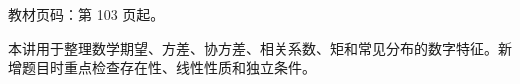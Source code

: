 
\begin{knowledgeBox}
教材页码：第 103 页起。

本讲用于整理数学期望、方差、协方差、相关系数、矩和常见分布的数字特征。新增题目时重点检查存在性、线性性质和独立条件。
\end{knowledgeBox}
